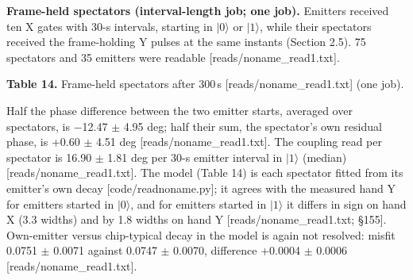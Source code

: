\documentclass[11pt]{article}
\begin{document}
\textbf{Frame-held spectators (interval-length job; one job).} Emitters received ten X gates with 30-\textmu s intervals, starting in \(|0\rangle\) or \(|1\rangle\), while their spectators received the frame-holding Y pulses at the same instants (Section 2.5). 75 spectators and 35 emitters were readable {[}reads/noname\_read1.txt{]}.

\textbf{Table 14.} Frame-held spectators after 300\,\textmu s {[}reads/noname\_read1.txt{]} (one job).

\par\smallskip{}\par\smallskip
Half the phase difference between the two emitter starts, averaged over spectators, is \(-\)12.47 \(\pm\) 4.95 deg; half their sum, the spectator's own residual phase, is +0.60 \(\pm\) 4.51 deg {[}reads/noname\_read1.txt{]}. The coupling read per spectator is 16.90 \(\pm\) 1.81 deg per 30-\textmu s emitter interval in \(|1\rangle\) (median) {[}reads/noname\_read1.txt{]}. The model (Table 14) is each spectator fitted from its emitter's own decay {[}code/readnoname.py{]}; it agrees with the measured hand Y for emitters started in \(|0\rangle\), and for emitters started in \(|1\rangle\) it differs in sign on hand X (3.3 widths) and by 1.8 widths on hand Y {[}reads/noname\_read1.txt; \S{}155{]}. Own-emitter versus chip-typical decay in the model is again not resolved: misfit 0.0751 \(\pm\) 0.0071 against 0.0747 \(\pm\) 0.0070, difference +0.0004 \(\pm\) 0.0006 {[}reads/noname\_read1.txt{]}.
\end{document}
